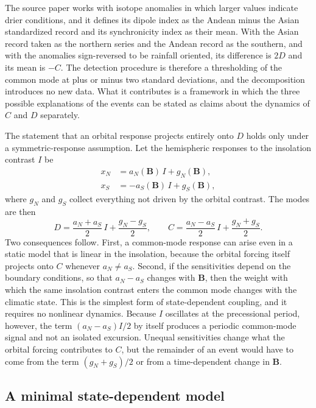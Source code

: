\documentclass[11pt]{article}
\theoremstyle{definition}
\newcommand{\bB}{\mathbf{B}}
\begin{document}
The source paper works with isotope anomalies in which larger values indicate drier conditions, and it defines its dipole index as the Andean minus the Asian standardized record and its synchronicity index as their mean. With the Asian record taken as the northern series and the Andean record as the southern, and with the anomalies sign-reversed to be rainfall oriented, its difference is $2D$ and its mean is $-C$. The detection procedure is therefore a thresholding of the common mode at plus or minus two standard deviations, and the decomposition introduces no new data. What it contributes is a framework in which the three possible explanations of the events can be stated as claims about the dynamics of $C$ and $D$ separately.

The statement that an orbital response projects entirely onto $D$ holds only under a symmetric-response assumption. Let the hemispheric responses to the insolation contrast $I$ be
\begin{equation}
\begin{split}
x_N &= a_N(\bB)\,I + g_N(\bB),\\
x_S &= -a_S(\bB)\,I + g_S(\bB),
\end{split}
\label{eq:asym}
\end{equation}
where $g_N$ and $g_S$ collect everything not driven by the orbital contrast. The modes are then
\begin{equation}
D = \frac{a_N + a_S}{2}\,I + \frac{g_N - g_S}{2}, \qquad
C = \frac{a_N - a_S}{2}\,I + \frac{g_N + g_S}{2}.
\label{eq:asymmodes}
\end{equation}
Two consequences follow. First, a common-mode response can arise even in a static model that is linear in the insolation, because the orbital forcing itself projects onto $C$ whenever $a_N \neq a_S$. Second, if the sensitivities depend on the boundary conditions, so that $a_N - a_S$ changes with $\bB$, then the weight with which the same insolation contrast enters the common mode changes with the climatic state. This is the simplest form of state-dependent coupling, and it requires no nonlinear dynamics. Because $I$ oscillates at the precessional period, however, the term $(a_N - a_S)I/2$ by itself produces a periodic common-mode signal and not an isolated excursion. Unequal sensitivities change what the orbital forcing contributes to $C$, but the remainder of an event would have to come from the term $(g_N + g_S)/2$ or from a time-dependent change in $\bB$.

\subsection{A minimal state-dependent model}
\end{document}

